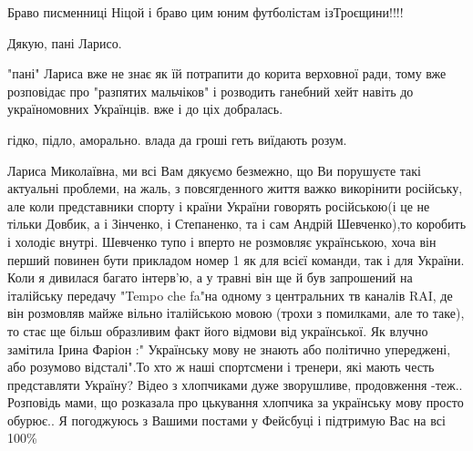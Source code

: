 \begin{itemize}
 
Браво писменниці Ніцой і браво цим юним футболістам ізТроєщини!!!!

 
Дякую, пані Ларисо.

 

"пані" Лариса вже не знає як їй потрапити до корита верховної ради, тому вже
розповідає про "разпятих мальчіков" і розводить ганебний хейт навіть до
україномовних Українців. вже і до ціх добралась.

гідко, підло, аморально. влада да гроші геть виїдають розум.

 

Лариса Миколаївна, ми всі Вам дякуємо безмежно, що Ви порушуєте такі актуальні
проблеми, на жаль, з повсягденного життя важко викорінити російську, але коли
представники спорту і країни України говорять російською(і це не тільки Довбик,
а і Зінченко, і Степаненко, та і сам Андрій Шевченко),то коробить і холодіє
внутрі. Шевченко тупо і вперто не розмовляє українською, хоча він перший повинен
бути прикладом номер 1 як для всієї команди, так і для України. Коли я дивилася
багато інтерв'ю, а у травні він ще й був запрошений на італійську передачу
"Tempo che fa"на одному з центральних тв каналів RAI, де він розмовляв майже
вільно італійською мовою (трохи з помилками, але то таке), то стає ще більш
образливим факт його відмови від української. Як влучно замітила Ірина Фаріон :"
Українську мову не знають або політично упереджені, або розумово відсталі".То
хто ж наші спортсмени і тренери, які мають честь представляти Україну? Відео з
хлопчиками дуже зворушливе, продовження -теж.. Розповідь мами, що розказала про
цькування хлопчика за українську мову просто обурює.. Я погоджуюсь з Вашими
постами у Фейсбуці і підтримую Вас на всі 100\%


\end{itemize}
